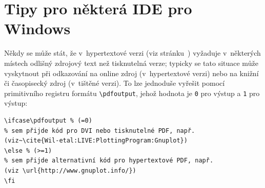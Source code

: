 \section{Tipy pro některá IDE pro Windows}\label{winide}%

Někdy se může stát, že v~hypertextové  verzi (viz
stránku~\pageref{pkghyperref}) vyžaduje v~některých místech odlišný zdrojový
text než tisknutelná verze; typicky se tato situace může vyskytnout při
odkazování na online zdroj (v~hypertextové verzi) nebo na knižní či
časopisecký zdroj (v~tištěné verzi). To lze jednoduše vyřešit pomocí
primitivního registru formátu  \verb!\pdfoutput!, jehož hodnota
je \texttt{0} pro  výstup a \texttt{1} pro 
výstup:

{\small
\begin{verbatim}
\ifcase\pdfoutput % (=0)
% sem přijde kód pro DVI nebo tisknutelné PDF, např.
(viz~\cite{Wil-etal:LIVE:PlottingProgram:Gnuplot})
\else % (>=1)
% sem přijde alternativní kód pro hypertextové PDF, např.
(viz \url{http://www.gnuplot.info/})
\fi
\end{verbatim}
\par}

